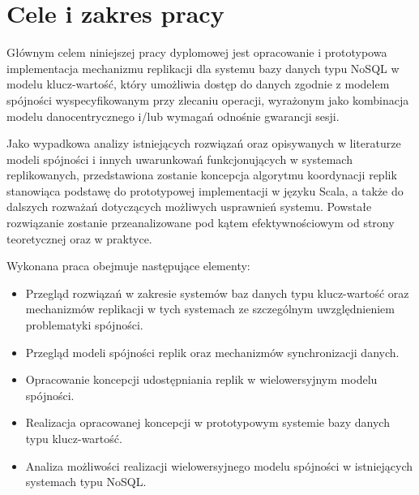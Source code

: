 \section{Cele i zakres pracy}

Głównym celem niniejszej pracy dyplomowej jest opracowanie i prototypowa implementacja mechanizmu replikacji dla systemu bazy danych typu NoSQL w modelu klucz-wartość, który umożliwia dostęp do danych zgodnie z modelem spójności wyspecyfikowanym przy zlecaniu operacji, wyrażonym jako kombinacja modelu danocentrycznego i/lub wymagań odnośnie gwarancji sesji.

Jako wypadkowa analizy istniejących rozwiązań oraz opisywanych w literaturze modeli spójności i innych uwarunkowań funkcjonujących w systemach replikowanych, przedstawiona zostanie koncepcja algorytmu koordynacji replik stanowiąca podstawę do prototypowej implementacji w języku Scala, a także do dalszych rozważań dotyczących możliwych usprawnień systemu. Powstałe rozwiązanie zostanie przeanalizowane pod kątem efektywnościowym od strony teoretycznej oraz w praktyce.

Wykonana praca obejmuje następujące elementy:

\begin{itemize}
    \item Przegląd rozwiązań w zakresie systemów baz danych typu klucz-wartość oraz mechanizmów replikacji w tych systemach ze szczególnym uwzględnieniem problematyki spójności.
    \item Przegląd modeli spójności replik oraz mechanizmów synchronizacji danych.
    \item Opracowanie koncepcji udostępniania replik w wielowersyjnym modelu spójności.
    \item Realizacja opracowanej koncepcji w prototypowym systemie bazy danych typu klucz-wartość.
    \item Analiza możliwości realizacji wielowersyjnego modelu spójności w istniejących systemach typu NoSQL.

\end{itemize}

